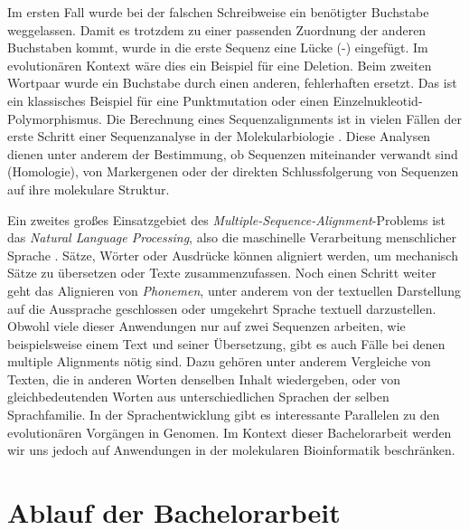 Im ersten Fall wurde bei der falschen Schreibweise ein benötigter Buchstabe weggelassen. Damit es trotzdem zu einer passenden Zuordnung der anderen Buchstaben kommt, wurde in die erste Sequenz eine Lücke (-) eingefügt. Im evolutionären Kontext wäre dies ein Beispiel für eine Deletion. Beim zweiten Wortpaar wurde ein Buchstabe durch einen anderen, fehlerhaften ersetzt. Das ist ein klassisches Beispiel für eine Punktmutation oder einen Einzelnukleotid-Polymorphismus. Die Berechnung eines Sequenzalignments ist in vielen Fällen der erste Schritt einer Sequenzanalyse in der Molekularbiologie \cite{cpm10}. Diese Analysen dienen unter anderem der Bestimmung, ob Sequenzen miteinander verwandt sind (Homologie), von Markergenen oder der direkten Schlussfolgerung von Sequenzen auf ihre molekulare Struktur. 

Ein zweites großes Einsatzgebiet des \emph{Multiple-Sequence-Alignment}-Problems ist das \emph{Natural Language Processing}, also die maschinelle Verarbeitung menschlicher Sprache \cite{s10}. Sätze, Wörter oder Ausdrücke können aligniert werden, um mechanisch Sätze zu übersetzen oder Texte zusammenzufassen. Noch einen Schritt weiter geht das Alignieren von \emph{Phonemen}, unter anderem von der textuellen Darstellung auf die Aussprache geschlossen oder umgekehrt Sprache textuell darzustellen. Obwohl viele dieser Anwendungen nur auf zwei Sequenzen arbeiten, wie beispielsweise einem Text und seiner Übersetzung, gibt es auch Fälle bei denen multiple Alignments nötig sind. Dazu gehören unter anderem Vergleiche von Texten, die in anderen Worten denselben Inhalt wiedergeben, oder von gleichbedeutenden Worten aus unterschiedlichen Sprachen der selben Sprachfamilie. In der Sprachentwicklung gibt es interessante Parallelen zu den evolutionären Vorgängen in Genomen. Im Kontext dieser Bachelorarbeit werden wir uns jedoch auf Anwendungen in der molekularen Bioinformatik beschränken.  

\section{Ablauf der Bachelorarbeit}

